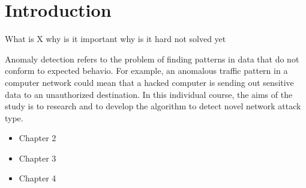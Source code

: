 \section{Introduction}

What is X
why is it important
why is it hard not solved yet

Anomaly detection refers to the problem of finding patterns in data that do not conform to expected behavio. For example, an anomalous traffic pattern in a computer network could mean that a hacked computer is sending out sensitive data to an unauthorized destination. In this individual course, the aims of the study is to research and to develop the algorithm to detect novel network attack type.

\begin{itemize}
\item Chapter 2
\item Chapter 3
\item Chapter 4
\end{itemize}
